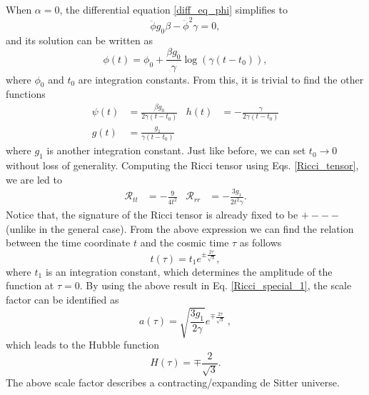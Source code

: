 \documentclass[epj]{svjour}
\begin{document}
When $\alpha = 0$, the differential equation \eqref{diff_eq_phi} simplifies to 
\begin{dmath}
\label{diff_eq_phi_alpha_0}
    \ddot{\phi}g_0\beta - \dot{\phi}^2 \gamma  = 0,
\end{dmath}
and its solution can be written as
\begin{equation}
\phi(t) = \phi_0 + \frac{\beta g_0}{\gamma}\log\left(\gamma(t-t_0)\right),
\end{equation}
where $\phi_0$ and $t_0$ are integration constants. From this, it is trivial to find the other functions
\begin{align}
\label{special_first_solution}
\psi(t) & = \frac{\beta g_0}{2\gamma(t-t_0)} & h(t) & = -\frac{\gamma}{2\gamma(t-t_0)} \\
g(t) & = \frac{g_1}{\gamma(t-t_0)}
\end{align}
where $g_1$ is another integration constant. Just like before, we can set  $t_0 \to 0$ without loss of generality. Computing the Ricci tensor using Eqs. \eqref{Ricci_tensor}, we are led to 
\begin{align}
\label{Ricci_special_1}
\mathcal{R}_{tt} & = -\frac{9}{4t^2} & \mathcal{R}_{rr} & = -\frac{3g_1}{2t^2\gamma}.
\end{align}
Notice that, the signature of the Ricci tensor is already fixed to be $+ - - -$ (unlike in the general case). From the above expression we can find the relation between the time coordinate $t$ and the cosmic time $\tau$ as follows
\begin{equation}
\label{special_1_t}
t(\tau) = t_1e^{\pm\frac{2\tau}{\sqrt{3}}},
\end{equation}
where $t_1$ is an integration constant, which determines the amplitude of the function at $\tau=0$. By using the above result in Eq. \eqref{Ricci_special_1},  the scale factor can be identified as 
\begin{equation}
a(\tau) =  \sqrt{\frac{3g_1}{2\gamma}}e^{\mp\frac{2\tau}{\sqrt{3}}} \ ,
\end{equation}
which leads to the Hubble function
\begin{equation}
H(\tau) = \mp\frac{2}{\sqrt{3}}.
\end{equation}
The above scale factor describes a contracting/expanding de Sitter universe.
\end{document}
